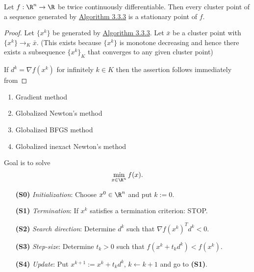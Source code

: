 Let $f:\R^n\to\R$ be twice continuously differentiable. Then every
cluster point of a sequence generated by \href{a7a5665}{Algorithm
	3.3.3} is a stationary point of $f$.

\begin{proof}

	\def\xk{\{x^k\}}
	\def\grad{\nabla f(x^k)}

	Let $\xk$ be generated by \href{a7a5665}{Algorithm 3.3.3}. Let
	$\bar x$ be a cluster point with $\xk\to_K\bar x$. (This exists
	because $\xk$ is monotone decreasing and hence there exists a
	subsequence $\xk_K$ that converges to any given cluster point)

	If $d^k=\grad$ for infinitely $k\in K$ then the assertion follows immediately from

\end{proof}

\label{a75d03d}

\begin{enumerate}
	\item Gradient method
	\item Globalized Newton's method
	\item Globalized BFGS method
	\item Globalized inexact Newton's method
\end{enumerate}

\label{edbf62c}

Goal is to solve
$$\min_{x\in\R^n}f(x).$$

\begin{enumerate}
	\item [\textbf{(S0)}] \textit{Initialization}: Choose $x^0\in\R^n$ and put $k:=0$.
	\item [\textbf{(S1)}] \textit{Termination}: If $x^k$ satisfies a termination criterion: STOP.
	\item [\textbf{(S2)}] \textit{Search direction}: Determine $d^k$ such that $\nabla f(x^k)^Td^k<0$.
	\item [\textbf{(S3)}] \textit{Step-size}: Determine $t_k>0$ such that $f(x^k+t_kd^k)<f(x^k)$.
	\item [\textbf{(S4)}] \textit{Update}: Put $x^{k+1}:=x^k+t_kd^k$, $k\gets k+1$ and go to \textbf{(S1)}.
\end{enumerate}

\label{ae01f6d}

